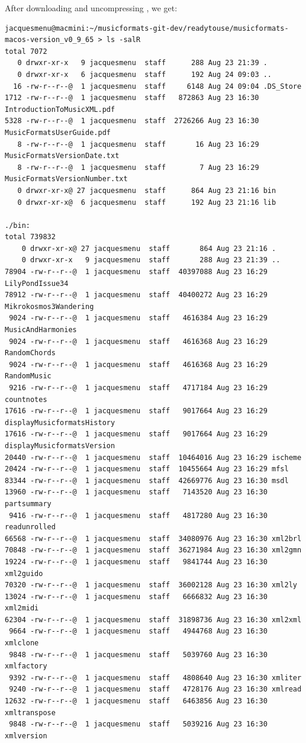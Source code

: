 After downloading and uncompressing , we get:
\begin{lstlisting}[language=Terminal]
jacquesmenu@macmini:~/musicformats-git-dev/readytouse/musicformats-macos-version_v0_9_65 > ls -salR
total 7072
   0 drwxr-xr-x   9 jacquesmenu  staff      288 Aug 23 21:39 .
   0 drwxr-xr-x   6 jacquesmenu  staff      192 Aug 24 09:03 ..
  16 -rw-r--r--@  1 jacquesmenu  staff     6148 Aug 24 09:04 .DS_Store
1712 -rw-r--r--@  1 jacquesmenu  staff   872863 Aug 23 16:30 IntroductionToMusicXML.pdf
5328 -rw-r--r--@  1 jacquesmenu  staff  2726266 Aug 23 16:30 MusicFormatsUserGuide.pdf
   8 -rw-r--r--@  1 jacquesmenu  staff       16 Aug 23 16:29 MusicFormatsVersionDate.txt
   8 -rw-r--r--@  1 jacquesmenu  staff        7 Aug 23 16:29 MusicFormatsVersionNumber.txt
   0 drwxr-xr-x@ 27 jacquesmenu  staff      864 Aug 23 21:16 bin
   0 drwxr-xr-x@  6 jacquesmenu  staff      192 Aug 23 21:16 lib

./bin:
total 739832
    0 drwxr-xr-x@ 27 jacquesmenu  staff       864 Aug 23 21:16 .
    0 drwxr-xr-x   9 jacquesmenu  staff       288 Aug 23 21:39 ..
78904 -rw-r--r--@  1 jacquesmenu  staff  40397088 Aug 23 16:29 LilyPondIssue34
78912 -rw-r--r--@  1 jacquesmenu  staff  40400272 Aug 23 16:29 Mikrokosmos3Wandering
 9024 -rw-r--r--@  1 jacquesmenu  staff   4616384 Aug 23 16:29 MusicAndHarmonies
 9024 -rw-r--r--@  1 jacquesmenu  staff   4616368 Aug 23 16:29 RandomChords
 9024 -rw-r--r--@  1 jacquesmenu  staff   4616368 Aug 23 16:29 RandomMusic
 9216 -rw-r--r--@  1 jacquesmenu  staff   4717184 Aug 23 16:29 countnotes
17616 -rw-r--r--@  1 jacquesmenu  staff   9017664 Aug 23 16:29 displayMusicformatsHistory
17616 -rw-r--r--@  1 jacquesmenu  staff   9017664 Aug 23 16:29 displayMusicformatsVersion
20440 -rw-r--r--@  1 jacquesmenu  staff  10464016 Aug 23 16:29 ischeme
20424 -rw-r--r--@  1 jacquesmenu  staff  10455664 Aug 23 16:29 mfsl
83344 -rw-r--r--@  1 jacquesmenu  staff  42669776 Aug 23 16:30 msdl
13960 -rw-r--r--@  1 jacquesmenu  staff   7143520 Aug 23 16:30 partsummary
 9416 -rw-r--r--@  1 jacquesmenu  staff   4817280 Aug 23 16:30 readunrolled
66568 -rw-r--r--@  1 jacquesmenu  staff  34080976 Aug 23 16:30 xml2brl
70848 -rw-r--r--@  1 jacquesmenu  staff  36271984 Aug 23 16:30 xml2gmn
19224 -rw-r--r--@  1 jacquesmenu  staff   9841744 Aug 23 16:30 xml2guido
70320 -rw-r--r--@  1 jacquesmenu  staff  36002128 Aug 23 16:30 xml2ly
13024 -rw-r--r--@  1 jacquesmenu  staff   6666832 Aug 23 16:30 xml2midi
62304 -rw-r--r--@  1 jacquesmenu  staff  31898736 Aug 23 16:30 xml2xml
 9664 -rw-r--r--@  1 jacquesmenu  staff   4944768 Aug 23 16:30 xmlclone
 9848 -rw-r--r--@  1 jacquesmenu  staff   5039760 Aug 23 16:30 xmlfactory
 9392 -rw-r--r--@  1 jacquesmenu  staff   4808640 Aug 23 16:30 xmliter
 9240 -rw-r--r--@  1 jacquesmenu  staff   4728176 Aug 23 16:30 xmlread
12632 -rw-r--r--@  1 jacquesmenu  staff   6463856 Aug 23 16:30 xmltranspose
 9848 -rw-r--r--@  1 jacquesmenu  staff   5039216 Aug 23 16:30 xmlversion


\end{lstlisting}
